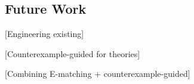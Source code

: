 \documentclass[oribibl]{llncs}
\begin{document}
\subsection{Future Work}

[Engineering existing]

[Counterexample-guided for theories]

[Combining E-matching + counterexample-guided]



\end{document}
